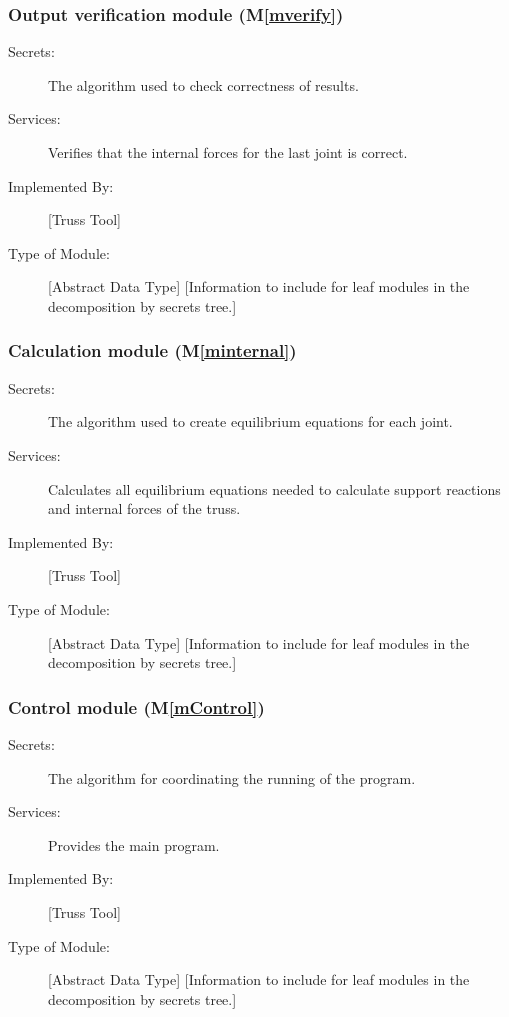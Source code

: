 \documentclass[12pt, titlepage]{article}
\newcommand{\mref}[1]{M\ref{#1}}
\begin{document}
\subsubsection{Output verification module (\mref{mverify})}

\begin{description}
\item[Secrets:]The algorithm used to check correctness of results.
\item[Services:] Verifies that the internal forces for the last joint is correct.
\item[Implemented By:] [Truss Tool]
\item[Type of Module:] [Abstract Data Type]
  [Information to include for leaf modules in the decomposition by secrets tree.]
\end{description}
\subsubsection{Calculation module (\mref{minternal})}

\begin{description}
\item[Secrets:]The algorithm used to create equilibrium equations for each joint.
\item[Services:] Calculates all equilibrium equations needed to calculate support reactions and internal forces of the truss. 
\item[Implemented By:] [Truss Tool]
\item[Type of Module:] [Abstract Data Type]
  [Information to include for leaf modules in the decomposition by secrets tree.]
\end{description}
\subsubsection{Control module (\mref{mControl})}

\begin{description}
\item[Secrets:]The algorithm for coordinating the running of the program.
\item[Services:] Provides the main program.
\item[Implemented By:] [Truss Tool]
\item[Type of Module:] [Abstract Data Type]
  [Information to include for leaf modules in the decomposition by secrets tree.]
\end{description}
\end{document}
